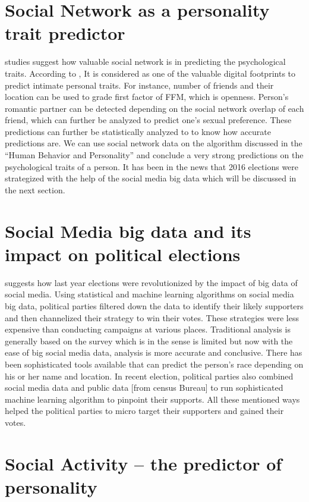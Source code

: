 \documentclass[sigconf]{acmart}
\begin{document}
\section{Social Network as a personality trait predictor}
 \cite{ref13} studies suggest how valuable social network is in predicting the psychological traits.  According to \cite{ref13}, It is considered as one of the valuable digital footprints to predict intimate personal traits. For instance, number of friends and their location can be used to grade first factor of FFM, which is openness. Person’s romantic partner can be detected depending on the social network overlap of each friend, which can further be analyzed to predict one’s sexual preference. These predictions can further be statistically analyzed to \cite{ref12} to know how accurate predictions are. We can use social network data on the algorithm discussed in the “Human Behavior and Personality” and conclude a very strong predictions on the psychological traits of a person. It has been in the news that 2016 elections were strategized with the help of the social media big data which will be discussed in the next section.
 
\section{Social Media big data and its impact on political elections}

\cite{ref14} suggests how last year elections were revolutionized by the impact of big data of social media. Using statistical and machine learning  algorithms on social media big data, political parties filtered down the data to identify their likely supporters and then channelized their strategy to win their votes. These strategies were less expensive than conducting campaigns at various places.  Traditional analysis is generally based on the  survey which is in the sense is limited \cite{ref15} but now with the ease of big social media data, analysis is more accurate and conclusive. There has been sophisticated tools available that can predict the person’s race depending on his or her name and location. In recent election, political parties also combined social media data and public data [from census Bureau] to run sophisticated machine learning algorithm to pinpoint their supports.  All these mentioned ways helped the political parties to micro target their supporters and gained their votes. 

\section{Social Activity – the predictor of personality}
\end{document}
